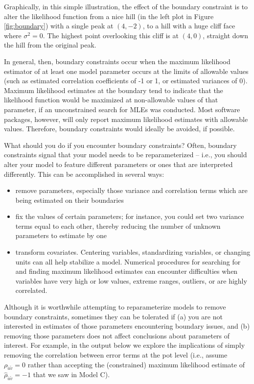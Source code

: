 \documentclass[
]{krantz}
\providecommand{\tightlist}{%
  \setlength{\itemsep}{0pt}\setlength{\parskip}{0pt}}
\begin{document}
Graphically, in this simple illustration, the effect of the boundary constraint is to alter the likelihood function from a nice hill (in the left plot in Figure \ref{fig:boundary}) with a single peak at \((4,-2)\), to a hill with a huge cliff face where \(\sigma^2=0\). The highest point overlooking this cliff is at \((4,0)\), straight down the hill from the original peak.

In general, then, boundary constraints occur when the maximum likelihood estimator of at least one model parameter occurs at the limits of allowable values (such as estimated correlation coefficients of -1 or 1, or estimated variances of 0). Maximum likelihood estimates at the boundary tend to indicate that the likelihood function would be maximized at non-allowable values of that parameter, if an unconstrained search for MLEs was conducted. Most software packages, however, will only report maximum likelihood estimates with allowable values. Therefore, boundary constraints would ideally be avoided, if possible.

What should you do if you encounter boundary constraints? Often, boundary constraints signal that your model needs to be reparameterized -- i.e., you should alter your model to feature different parameters or ones that are interpreted differently. This can be accomplished in several ways:

\begin{itemize}
\tightlist
\item
  remove parameters, especially those variance and correlation terms which are being estimated on their boundaries
\item
  fix the values of certain parameters; for instance, you could set two variance terms equal to each other, thereby reducing the number of unknown parameters to estimate by one
\item
  transform covariates. Centering variables, standardizing variables, or changing units can all help stabilize a model. Numerical procedures for searching for and finding maximum likelihood estimates can encounter difficulties when variables have very high or low values, extreme ranges, outliers, or are highly correlated.
\end{itemize}

Although it is worthwhile attempting to reparameterize models to remove boundary constraints, sometimes they can be tolerated if (a) you are not interested in estimates of those parameters encountering boundary issues, and (b) removing those parameters does not affect conclusions about parameters of interest. For example, in the output below we explore the implications of simply removing the correlation between error terms at the pot level (i.e., assume \(\rho_{\tilde{u}\tilde{v}}=0\) rather than accepting the (constrained) maximum likelihood estimate of \(\hat{\rho}_{\tilde{u}\tilde{v}}=-1\) that we saw in Model C).
\end{document}
